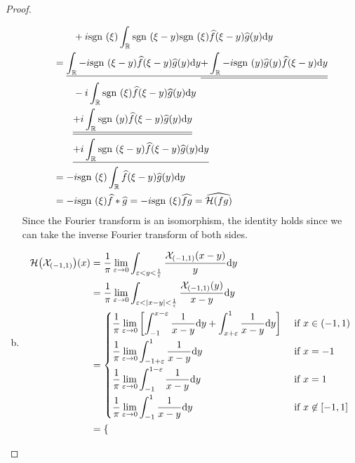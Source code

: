 \documentclass{article} %
\theoremstyle{plain}
\newcommand{\E}{\varepsilon}
\def\Rl{\mathbb{R}}
\newcommand{\sgn}{\text{\rm sgn }}
\newcommand{\Hilb}{\mathcal{H}}
\numberwithin{equation}{section} %
\numberwithin{figure}{section} %
\numberwithin{table}{section} %
\begin{document}
\begin{proof}
\begin{enumerate}[(a)]
\begin{align*}
            &\qquad +i\sgn(\xi) \int_\Rl \sgn(\xi - y)\sgn(\xi)\widehat{f}(\xi - y)\widehat{g}(y) \dd y \\
            &= \underline{\int_\Rl -i\sgn(\xi-y)\widehat{f}(\xi - y)\widehat{g}(y)\dd y} \underline{\underline{+ \int_\Rl -i\sgn(y)\widehat{g}(y)\widehat{f}(\xi - y) \dd y}} \\
            &\qquad - i\int_\Rl \sgn(\xi)\widehat{f}(\xi - y)\widehat{g}(y)\dd y \\
            &\qquad \underline{\underline{+ i \int_\Rl \sgn(y)\widehat{f}(\xi - y)\widehat{g}(y)\dd y}} \\
            &\qquad \underline{+i \int_\Rl \sgn(\xi - y)\widehat{f}(\xi - y)\widehat{g}(y) \dd y} \\
            &= -i\sgn(\xi)\int_\Rl \widehat{f}(\xi - y)\widehat{g}(y) \dd y \\
            &= -i\sgn(\xi)\widehat{f}*\widehat{g} = -i\sgn(\xi)\widehat{fg} = \widehat{\Hilb(fg)}
        \end{align*}
        Since the Fourier transform is an isomorphism, the identity holds since we can take the inverse Fourier transform of both sides.
        \item \begin{align*}
            \Hilb\qty(\mathcal{X}_{(-1,1)})(x) &= \frac{1}{\pi}\lim_{\E \rightarrow 0}\int_{\E < y < \frac{1}{\E}} \frac{\mathcal{X}_{(-1, 1)}(x - y)}{y} \dd y \\
            &= \frac{1}{\pi}\lim_{\E \rightarrow 0}\int_{\E < \abs{x - y} < \frac{1}{\E}}\frac{\mathcal{X}_{(-1,1)}(y)}{x - y} \dd y \\
            &= \begin{cases}
                \displaystyle\frac{1}{\pi}\lim_{\E\rightarrow 0}\qty[\int_{-1}^{x - \E}\frac{1}{x - y}\dd y + \int_{x + \E}^1 \frac{1}{x - y}\dd y] & \text{ if } x \in (-1, 1) \\[.3cm]
                \displaystyle\frac{1}{\pi}\lim_{\E\rightarrow 0}\int_{-1 + \E}^1 \frac{1}{x - y} \dd y & \text{ if } x = -1 \\[.3cm]
                \displaystyle\frac{1}{\pi}\lim_{\E\rightarrow 0}\int_{-1}^{1 - \E} \frac{1}{x - y} \dd y & \text{ if } x = 1 \\[.3cm]
                \displaystyle\frac{1}{\pi}\lim_{\E\rightarrow 0}\int_{-1}^1 \frac{1}{x - y} \dd y & \text{ if } x \not\in [-1, 1]
            \end{cases} \\
            &= \begin{cases}

\end{cases}
\end{align*}
\end{enumerate}
\end{proof}
\end{document}
